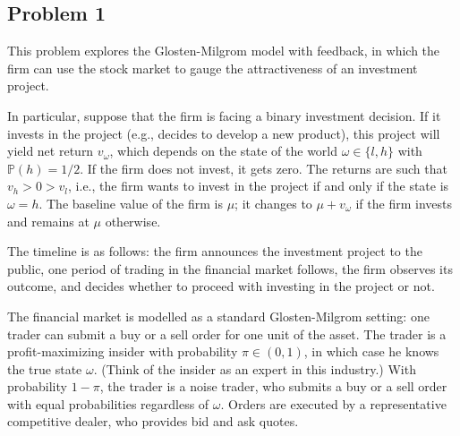 \ifreexam


\subsection*{Problem 1}
	This problem explores the Glosten-Milgrom model with feedback, in which the firm can use the stock market to gauge the attractiveness of an investment project.
	
	In particular, suppose that the firm is facing a binary investment decision. If it invests in the project (e.g., decides to develop a new product), this project will yield net return $v_\omega$, which depends on the state of the world $\omega \in \{l,h\}$ with $\mathbb{P}(h)=1/2$. If the firm does not invest, it gets zero. The returns are such that $v_h > 0 > v_l$, i.e., the firm wants to invest in the project if and only if the state is $\omega=h$. The baseline value of the firm is $\mu$; it changes to $\mu + v_\omega$ if the firm invests and remains at $\mu$ otherwise.
	
	The timeline is as follows: the firm announces the investment project to the public, one period of trading in the financial market follows, the firm observes its outcome, and decides whether to proceed with investing in the project or not.
	
	The financial market is modelled as a standard Glosten-Milgrom setting: one trader can submit a buy or a sell order for one unit of the asset. The trader is a profit-maximizing insider with probability $\pi \in (0,1)$, in which case he knows the true state $\omega$. (Think of the insider as an expert in this industry.) With probability $1-\pi$, the trader is a noise trader, who submits a buy or a sell order with equal probabilities regardless of $\omega$. Orders are executed by a representative competitive dealer, who provides bid and ask quotes.

